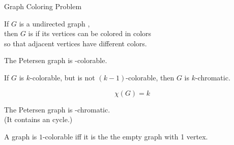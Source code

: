 
\begin{frame}{}

  \vspace{0.30cm}
  \begin{center}
    Graph Coloring Problem
  \end{center}
\end{frame}

\begin{frame}{}
  \begin{definition}
    If $G$ is a  undirected graph , \\
    then $G$ is  if its vertices can be colored in  colors
    \\ so that adjacent vertices have different colors.
  \end{definition}

  \pause
  \begin{center}
    The Petersen graph is -colorable.
  \end{center}
\end{frame}

\begin{frame}{}
  \begin{definition}
    If $G$ is $k$-colorable, but is not $(k-1)$-colorable,
    then $G$ is $k$-chromatic.

    \[
      \chi(G) = k
    \]
  \end{definition}

  \pause
  \begin{center}
    The Petersen graph is -chromatic. \\
    \pause
    (It contains an  cycle.)
  \end{center}
\end{frame}

\begin{frame}{}
  \begin{lemma}
    A graph is $1$-colorable iff \pause it is the the empty graph with 1 vertex.
  \end{lemma}
\end{frame}

